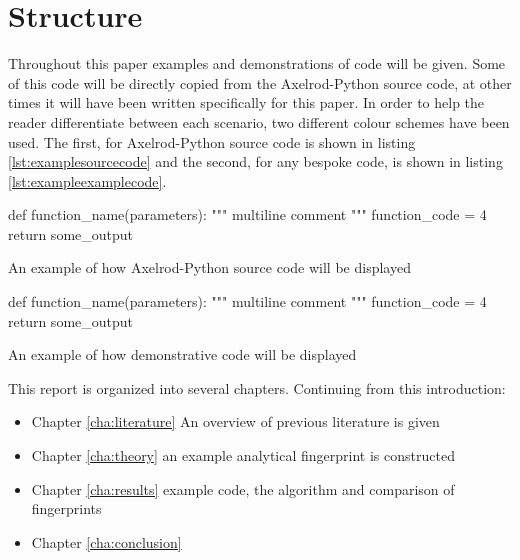 \section{Structure}

Throughout this paper examples and demonstrations of code will be given.
Some of this code will be directly copied from the Axelrod-Python source code, at other times it will have been written specifically for this paper.
In order to help the reader differentiate between each scenario, two different colour schemes have been used.
The first, for Axelrod-Python source code is shown in listing \ref{lst:examplesourcecode} and the second, for any bespoke code, is shown in listing \ref{lst:exampleexamplecode}.

\begin{listing}[hbtp!]
\begin{SourceCode}
def function_name(parameters):
    """
    multiline comment
    """
    function_code = 4
    return some_output
\end{SourceCode}
\caption{An example of how Axelrod-Python source code will be displayed}
\label{lst:examplesourcecode}
\end{listing}

\begin{listing}[hbtp!]
\begin{ExampleCode}
def function_name(parameters):
    """
    multiline comment
    """
    function_code = 4
    return some_output
\end{ExampleCode}
\caption{An example of how demonstrative code will be displayed}
\label{lst:exampleexamplecode}
\end{listing}{}

This report is organized into several chapters. Continuing from this introduction:

\begin{itemize}
    \item Chapter \ref{cha:literature} An overview of previous literature is given
    \item Chapter \ref{cha:theory} an example analytical fingerprint is constructed
    \item Chapter \ref{cha:results} example code, the algorithm and comparison of fingerprints
    \item Chapter \ref{cha:conclusion}
\end{itemize}

